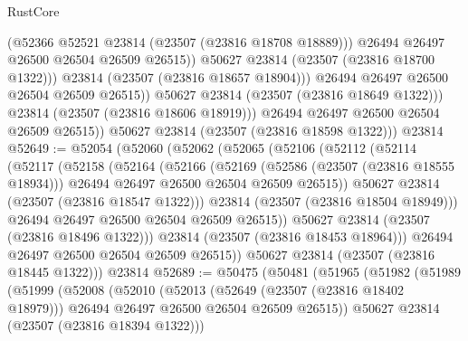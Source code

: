 \begin{lexlean}{RustCore}
\begin{coremodule}
                          (@52366 @52521 @23814 (@23507 (@23816 @18708 @18889)))
                          @26494
                          @26497
                          @26500
                          @26504
                          @26509
                          @26515))
                      @50627
                      @23814
                      (@23507 (@23816 @18700 @1322)))
                    @23814
                    (@23507 (@23816 @18657 @18904)))
                  @26494
                  @26497
                  @26500
                  @26504
                  @26509
                  @26515))
              @50627
              @23814
              (@23507 (@23816 @18649 @1322)))
            @23814
            (@23507 (@23816 @18606 @18919)))
          @26494
          @26497
          @26500
          @26504
          @26509
          @26515))
      @50627
      @23814
      (@23507 (@23816 @18598 @1322)))
    @23814
@52649 := @52054
    (@52060
      (@52062
        (@52065
          (@52106
            (@52112
              (@52114
                (@52117
                  (@52158
                    (@52164
                      (@52166
                        (@52169
                          (@52586 (@23507 (@23816 @18555 @18934)))
                          @26494
                          @26497
                          @26500
                          @26504
                          @26509
                          @26515))
                      @50627
                      @23814
                      (@23507 (@23816 @18547 @1322)))
                    @23814
                    (@23507 (@23816 @18504 @18949)))
                  @26494
                  @26497
                  @26500
                  @26504
                  @26509
                  @26515))
              @50627
              @23814
              (@23507 (@23816 @18496 @1322)))
            @23814
            (@23507 (@23816 @18453 @18964)))
          @26494
          @26497
          @26500
          @26504
          @26509
          @26515))
      @50627
      @23814
      (@23507 (@23816 @18445 @1322)))
    @23814
@52689 := @50475
    (@50481
      (@51965
        (@51982
          (@51989
            (@51999
              (@52008
                (@52010
                  (@52013
                    (@52649 (@23507 (@23816 @18402 @18979)))
                    @26494
                    @26497
                    @26500
                    @26504
                    @26509
                    @26515))
                @50627
                @23814
                (@23507 (@23816 @18394 @1322)))

\end{coremodule}
\end{lexlean}
